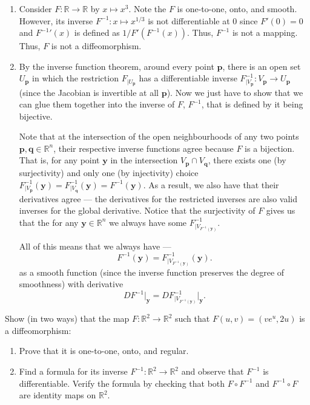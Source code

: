 \documentclass[12 pt, letterpaper]{hmcpset}
\begin{document}
\begin{solution}
	\begin{enumerate}
		\item
			Consider $F : \mathbb{R} \to \mathbb{R}$ by $x \mapsto x^3$. Note the $F$ is one-to-one, onto, and smooth. However, its inverse $F^{-1} : x \mapsto x^{1/3}$ is not differentiable at $0$ since $F'(0) = 0$ and ${F^{-1}}'(x)$ is defined as $1/F'(F^{-1}(x))$. Thus, $F^{-1}$ is not a mapping. Thus, $F$ is not a diffeomorphism.
		\item
			By the inverse function theorem, around every point $\mathbf{p}$, there is an open set $U_{\mathbf{p}}$ in which the restriction $F_{|U_{\mathbf{p}}}$ has a differentiable inverse $F^{-1}_{|V_{\mathbf{p}}} : V_{\mathbf{p}} \to U_{\mathbf{p}}$ (since the Jacobian is invertible at all $\mathbf{p}$). Now we just have to show that we can glue them together into the inverse of $F$, $F^{-1}$, that is defined by it being bijective. 

			Note that at the intersection of the open neighbourhoods of any two points $\mathbf{p}, \mathbf{q} \in \mathbb{R}^n$, their respective inverse functions agree because $F$ is a bijection. That is, for any point $\mathbf{y}$ in the intersection $V_\mathbf{p} \cap V_\mathbf{q}$, there exists one (by surjectivity) and only one (by injectivity) choice $F^{-1}_{|V_\mathbf{p}}(\mathbf{y}) = F^{-1}_{|V_\mathbf{q}}(\mathbf{y}) = F^{-1}(\mathbf{y})$. As a result, we also have that their derivatives agree --- the derivatives for the restricted inverses are also valid inverses for the global derivative. Notice that the surjectivity of $F$ gives us that the for any $\mathbf{y} \in \mathbb{R}^{n}$ we always have some $F^{-1}_{|V_{F^{-1}(\mathbf{y})}}$. 

			All of this means that we always have ---
			\[
				F^{-1}(\mathbf{y}) = F^{-1}_{|V_{F^{-1}(\mathbf{y})}}(\mathbf{y}).
			\]
			as a smooth function (since the inverse function preserves the degree of smoothness) with derivative
			\[
				DF^{-1} \Big |_{\mathbf{y}} = DF^{-1}_{|V_{F^{-1}(\mathbf{y})}} \Big |_{\mathbf{y}}.
			\]
	\end{enumerate}
\end{solution}

\pagebreak

\begin{problem}[Problem 2.]
	Show (in two ways) that the map $F : \mathbb{R}^2 \to \mathbb{R}^2$ such that $F(u, v) = (v e^u, 2u)$ is a diffeomorphism:
	\begin{enumerate}
		\item Prove that it is one-to-one, onto, and regular.
		\item Find a formula for its inverse  $F^{-1} : \mathbb{R}^2 \to \mathbb{R}^2$ and observe that $F^{-1}$ is differentiable. Verify the formula by checking that both $F \circ F^{-1}$ and $F^{-1} \circ F$ are identity maps on $\mathbb{R}^2$.
	\end{enumerate}
\end{problem}
\end{document}
